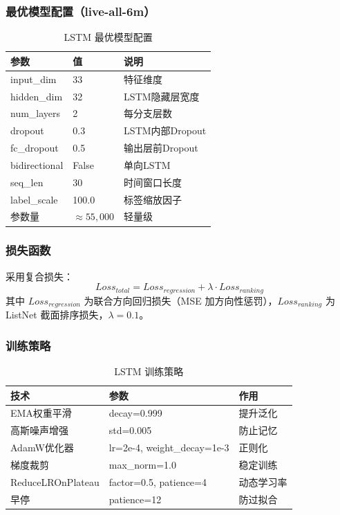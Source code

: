 \documentclass[12pt,a4paper]{ctexart}
\begin{document}
	\subsubsection{最优模型配置（live-all-6m）}
	\begin{table}[H]
		\centering
		\caption{LSTM 最优模型配置}
		\label{tab:model_config}
		\begin{tabular}{lll}
			\toprule
			\textbf{参数} & \textbf{值} & \textbf{说明} \\
			\midrule
			input\_dim & 33 & 特征维度 \\
			hidden\_dim & 32 & LSTM隐藏层宽度 \\
			num\_layers & 2 & 每分支层数 \\
			dropout & 0.3 & LSTM内部Dropout \\
			fc\_dropout & 0.5 & 输出层前Dropout \\
			bidirectional & False & 单向LSTM \\
			seq\_len & 30 & 时间窗口长度 \\
			label\_scale & 100.0 & 标签缩放因子 \\
			\midrule
			参数量 & $\approx 55,000$ & 轻量级 \\
			\bottomrule
		\end{tabular}
	\end{table}
	
	\subsubsection{损失函数}
	采用复合损失：
	\[
	Loss_{total} = Loss_{regression} + \lambda \cdot Loss_{ranking}
	\]
	其中 \(Loss_{regression}\) 为联合方向回归损失（MSE 加方向性惩罚），\(Loss_{ranking}\) 为 ListNet 截面排序损失，\(\lambda = 0.1\)。
	
	\subsubsection{训练策略}
	\begin{table}[H]
		\centering
		\caption{LSTM 训练策略}
		\label{tab:train_strategy}
		\begin{tabular}{lll}
			\toprule
			技术 & 参数 & 作用 \\
			\midrule
			EMA权重平滑 & decay=0.999 & 提升泛化 \\
			高斯噪声增强 & std=0.005 & 防止记忆 \\
			AdamW优化器 & lr=2e-4, weight\_decay=1e-3 & 正则化 \\
			梯度裁剪 & max\_norm=1.0 & 稳定训练 \\
			ReduceLROnPlateau & factor=0.5, patience=4 & 动态学习率 \\
			早停 & patience=12 & 防过拟合 \\
			\bottomrule
		\end{tabular}
	\end{table}
	
\end{document}
